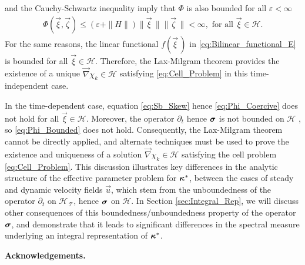 \documentclass[11pt]{amsart}
\newcommand{\Tc}{\mathcal{T}}
\newcommand{\Hs}{\mathscr{H}}
\newcommand\bsig{\mbox{\boldmath${\sigma}$}}
\newcommand\bkappa{\mbox{\boldmath${\kappa}$}}
\begin{document}
and the Cauchy-Schwartz inequality imply that $\Phi$ is also bounded for
all $\varepsilon<\infty$
%
\begin{align}\label{eq:Phi_Bounded}
  \Phi(\vec{\xi},\vec{\zeta})\leq(\varepsilon+\|H\|)\|\vec{\xi}\,\|\|\vec{\zeta}\,\|<\infty,
  \text{ for all } \vec{\xi}\in\Hs.
\end{align}
%
For the same reasons, the linear functional $f(\vec{\xi}\,)$ in
\eqref{eq:Bilinear_functional_E} is bounded for all
$\vec{\xi}\in\Hs$. Therefore, the Lax-Milgram theorem
\cite{McOwen:2003:PDE} provides the existence of a unique
$\vec{\nabla}\chi_k\in\Hs$ satisfying \eqref{eq:Cell_Problem} in this
time-independent case. 


In the time-dependent case, equation \eqref{eq:Sb_Skew} hence
\eqref{eq:Phi_Coercive} does not hold for all $\vec{\xi}\in\Hs$. Moreover, 
the operator $\partial_t$ hence $\bsig$ is not bounded on $\Hs$
\cite{Reed-1980,Stakgold:BVP:2000}, so \eqref{eq:Phi_Bounded} does not
hold. Consequently, the Lax-Milgram theorem cannot be directly
applied, and alternate techniques  
\cite{Friedman:1969:PDE,Friedman:1969:PDE:Parabolic} must be used to
prove the existence and uniqueness of a solution $\vec{\nabla}\chi_k\in\Hs$ 
satisfying the cell problem \eqref{eq:Cell_Problem}. This discussion
illustrates key differences in the analytic structure of the effective
parameter problem for $\bkappa^*$, between the cases of steady and
dynamic velocity fields $\vec{u}$, which stem from the unboundedness
of the operator $\partial_t$ on $\Hs_{\,\Tc}$, hence $\bsig$ on $\Hs$. In Section
\ref{sec:Integral_Rep}, we will discuss other consequences of this
boundedness/unboundedness property of the operator $\bsig$, and
demonstrate that it leads to significant differences in the spectral
measure underlying an  integral representation of $\bkappa^*$.     






\medskip

{\bf Acknowledgements.}


\medskip



\end{document}
